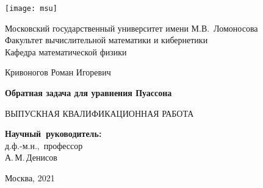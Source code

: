 \begin{titlepage}
	
	\begin{center}
		\texttt{[image: msu]}
		
		Московский государственный университет имени М.В.~Ломоносова\\
		Факультет вычислительной математики и кибернетики\\
		Кафедра математической физики
		
		\vspace{1.5cm}
		
		\Large{Кривоногов Роман Игоревич}
		
		\vspace{0.25cm}
		
		\textbf{\LARGE{Обратная задача для уравнения Пуассона}}
		
		\vspace{1.5cm}
		
	    \small{ВЫПУСКНАЯ КВАЛИФИКАЦИОННАЯ РАБОТА}
	\end{center}
	
	\vspace{2.5cm}
	
	\begin{flushright}
		\large{
			\textbf{Научный~руководитель:}\\
			д.ф.-м.н.,~профессор\\
			А.\,М.\,Денисов
		}
	\end{flushright}
	
	\vfill
	
	\begin{center}
		Москва, 2021
	\end{center}
	
\end{titlepage}

\pagebreak
